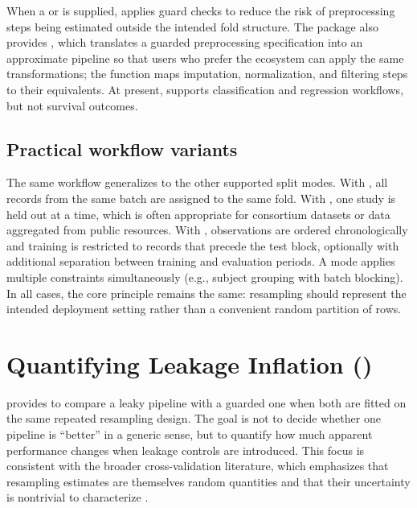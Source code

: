 \documentclass[article,shortnames]{jss}
\begin{document}
When a  or  is supplied,  applies guard checks to reduce the risk of preprocessing steps being estimated outside the intended fold structure. The package also provides , which translates a guarded preprocessing specification into an approximate  pipeline so that users who prefer the  ecosystem can apply the same transformations; the function maps imputation, normalization, and filtering steps to their  equivalents. At present,  supports classification and regression workflows, but not survival outcomes.

\subsection{Practical workflow variants}

The same workflow generalizes to the other supported split modes. With , all records from the same batch are assigned to the same fold. With , one study is held out at a time, which is often appropriate for consortium datasets or data aggregated from public resources. With , observations are ordered chronologically and training is restricted to records that precede the test block, optionally with additional separation between training and evaluation periods. A  mode applies multiple constraints simultaneously (e.g., subject grouping with batch blocking). In all cases, the core principle remains the same: resampling should represent the intended deployment setting rather than a convenient random partition of rows.

\section[Quantifying Leakage Inflation (Delta LSI)]{Quantifying Leakage Inflation ()}\label{sec:dlsi}

 provides  to compare a leaky pipeline
with a guarded one when both are fitted on the same repeated resampling design.
The goal is not to decide whether one pipeline is ``better'' in a generic
sense, but to quantify how much apparent performance changes when leakage
controls are introduced. This focus is consistent with the broader
cross-validation literature, which emphasizes that resampling estimates are
themselves random quantities and that their uncertainty is nontrivial to
characterize \citep{bengio2004, bates2024}.
\end{document}
